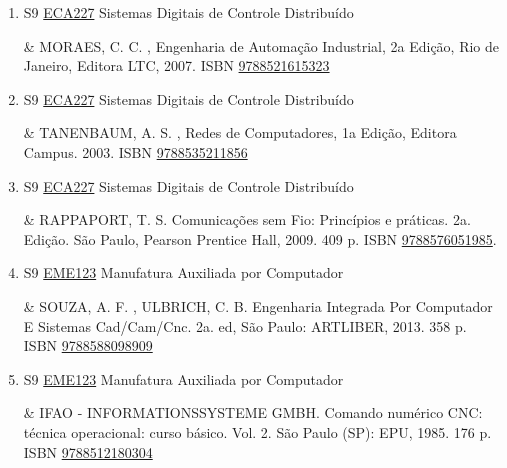 \documentclass[12pt,a4paper]{book}
\begin{document}
\begin{enumerate}
&  CAPELLI, Alexandre.  Automação industrial: controle do movimento e processos contínuos.  2. ed.  São Paulo: Érica, 2008/2010.  236p.    ISBN \href{http://www.bn.br/site/pages/servicosProfissionais/agenciaISBN/isbnBusca/FbnBuscaISBNCatalogo.asp?pField=ISBN&pIntPagina=1&pISBN=36501178&nidbISBN=true&hidbISBN=true}{9788536501178}
 

 \item S9 \hyperref[PUD:ECA227]{ECA227} Sistemas Digitais de Controle Distribuído

&  MORAES, C.  C. , Engenharia de Automação Industrial, 2a Edição, Rio de Janeiro, Editora LTC, 2007.  ISBN \href{http://www.bn.br/site/pages/servicosProfissionais/agenciaISBN/isbnBusca/FbnBuscaISBNCatalogo.asp?pField=ISBN&pIntPagina=1&pISBN=21615323&nidbISBN=true&hidbISBN=true}{9788521615323}
 

 \item S9 \hyperref[PUD:ECA227]{ECA227} Sistemas Digitais de Controle Distribuído

& TANENBAUM, A.  S. , Redes de Computadores, 1a Edição, Editora Campus.  2003.  ISBN \href{http://www.bn.br/site/pages/servicosProfissionais/agenciaISBN/isbnBusca/FbnBuscaISBNCatalogo.asp?pField=ISBN&pIntPagina=1&pISBN=35211856&nidbISBN=true&hidbISBN=true}{9788535211856}
 

 \item S9 \hyperref[PUD:ECA227]{ECA227} Sistemas Digitais de Controle Distribuído

&   RAPPAPORT, T.  S.  Comunicações sem Fio: Princípios e práticas.  2a.  Edição.  São Paulo, Pearson Prentice Hall, 2009.  409 p.  ISBN \href{http://www.bn.br/site/pages/servicosProfissionais/agenciaISBN/isbnBusca/FbnBuscaISBNCatalogo.asp?pField=ISBN&pIntPagina=1&pISBN=76051985&nidbISBN=true&hidbISBN=true}{9788576051985}.
 \item S9 \hyperref[PUD:EME123]{EME123} Manufatura Auxiliada por Computador

&  SOUZA, A.  F. , ULBRICH, C.  B.  Engenharia Integrada Por Computador E Sistemas Cad/Cam/Cnc.  2a.  ed, São Paulo: ARTLIBER, 2013.  358 p.  ISBN \href{http://www.bn.br/site/pages/servicosProfissionais/agenciaISBN/isbnBusca/FbnBuscaISBNCatalogo.asp?pField=ISBN&pIntPagina=1&pISBN=88098909&nidbISBN=true&hidbISBN=true}{9788588098909}
 

 \item S9 \hyperref[PUD:EME123]{EME123} Manufatura Auxiliada por Computador

&  IFAO - INFORMATIONSSYSTEME GMBH.  Comando numérico CNC: técnica operacional: curso básico.  Vol.  2.  São Paulo (SP): EPU, 1985.  176 p.  ISBN \href{http://www.bn.br/site/pages/servicosProfissionais/agenciaISBN/isbnBusca/FbnBuscaISBNCatalogo.asp?pField=ISBN&pIntPagina=1&pISBN=12180304&nidbISBN=true&hidbISBN=true}{9788512180304}
 


\end{enumerate}
\end{document}
